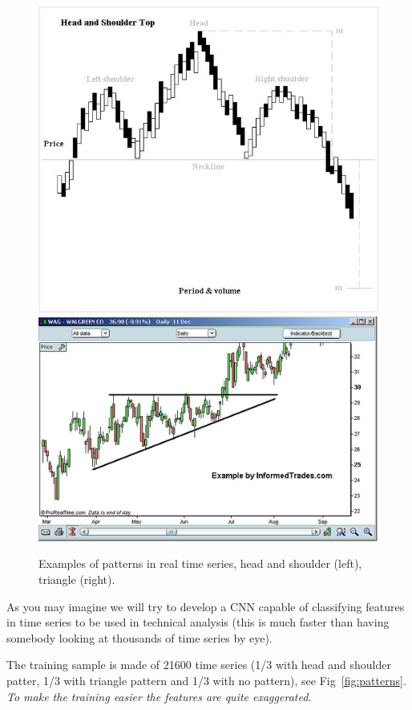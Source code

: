 \begin{figure}[htb]
	\centering
	\includegraphics[width=0.4\linewidth]{figures/H_and_s_top_new.jpg}\qquad
	\includegraphics[width=0.4\linewidth]{figures/Triangle-ascending.jpg}
	\caption{Examples of patterns in real time series, head and shoulder (left), triangle (right).}
        \label{fig:tech_ana}
\end{figure}

As you may imagine we will try to develop a CNN capable of classifying features 
in time series to be used in technical analysis (this is much faster than having somebody looking at
thousands of time series by eye).

The training sample is made of 21600 time series
(1/3 with head and shoulder patter, 1/3 with triangle pattern and 1/3
with no pattern), see Fig~\ref{fig:patterns}.
\emph{To make the training easier the features are quite exaggerated.}

